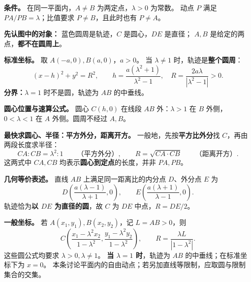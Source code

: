 \begin{statementbox}
\textbf{条件。} 在同一平面内，$A\ne B$ 为两定点，$\lambda>0$ 为常数。
动点 $P$ 满足 $PA/PB=\lambda$；比值要求 $P\ne B$，且此时也有 $P\ne A$。


\textbf{先认图中的对象：} 蓝色圆周是轨迹，$C$ 是圆心，$DE$ 是直径；
$A,B$ 是给定的两点，\textbf{都不在圆周上}。

\textbf{标准坐标。} 取 $A(-a,0),B(a,0)$，$a>0$。
当 $\lambda\ne1$ 时，轨迹是\textbf{整个圆周}：
\[
 \boxed{(x-h)^2+y^2=R^2},\qquad
 h=\frac{a(\lambda^2+1)}{\lambda^2-1},\quad
 R=\frac{2a\lambda}{|\lambda^2-1|}>0.
\]
\textbf{分界：}$\lambda=1$ 时不是圆，轨迹为 $AB$ 的中垂线。
\end{statementbox}
\clearpage
\begin{statementbox}
\textbf{圆心位置与速算公式。}
圆心 $C(h,0)$ 在线段 $AB$ 外：$\lambda>1$ 在 $B$ 外侧，
$0<\lambda<1$ 在 $A$ 外侧。圆周不经过 $A,B$。


\textbf{最快求圆心、半径：平方外分，距离开方。}
一般地，先按\textbf{平方比外分}找 $C$，再由两段长度求半径：
\[
 \boxed{CA:CB=\lambda^2:1}\qquad\text{（平方外分）},
 \qquad \boxed{R=\sqrt{CA\cdot CB}}\qquad\text{（距离开方）}.
\]
这两式中 $CA,CB$ 均表示\textbf{圆心到定点}的长度，并非 $PA,PB$。

\textbf{几何等价表述。} 直线 $AB$ 上满足同一距离比的内分点 $D$、外分点 $E$ 为
\[
 D\left(\frac{a(\lambda-1)}{\lambda+1},0\right),\qquad
 E\left(\frac{a(\lambda+1)}{\lambda-1},0\right).
\]
轨迹恰为\textbf{以 $DE$ 为直径的圆}，故 $C$ 为 $DE$ 中点，$R=DE/2$。

\textbf{一般坐标。} 若 $A(x_1,y_1),B(x_2,y_2)$，记 $L=AB>0$，则
\[
 C\left(\frac{x_1-\lambda^2x_2}{1-\lambda^2},
         \frac{y_1-\lambda^2y_2}{1-\lambda^2}\right),\qquad
 R=\frac{\lambda L}{|1-\lambda^2|}.
\]
这些圆公式均要求 $\lambda>0,\lambda\ne1$。
\textbf{当 $\lambda=1$ 时}，轨迹为 $AB$ 的中垂线；在标准坐标下为 $x=0$。
本条讨论平面内的自由动点；若另加直线等限制，应取圆与限制集合的交集。
\end{statementbox}
